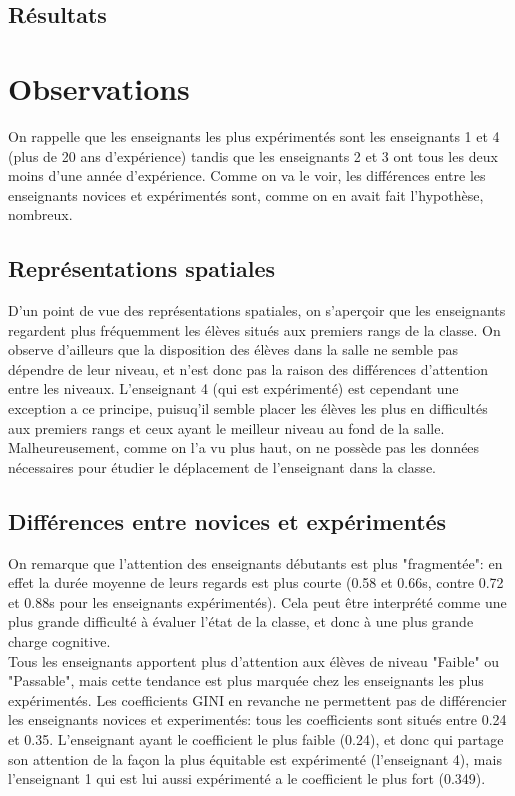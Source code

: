 \documentclass{article}
\begin{document}
\subsection{Résultats}

\section{Observations}
On rappelle que les enseignants les plus expérimentés sont les enseignants 1 et 4 (plus de 20 ans d'expérience) tandis que les enseignants 2 et 3 ont tous les deux moins d'une année d'expérience. Comme on va le voir, les différences entre les enseignants novices et expérimentés sont, comme on en avait fait l'hypothèse, nombreux.
\subsection{Représentations spatiales}
D'un point de vue des représentations spatiales, on s'aperçoir que les enseignants regardent plus fréquemment les élèves situés aux premiers rangs de la classe. On observe d'ailleurs que la disposition des élèves dans la salle ne semble pas dépendre de leur niveau, et n'est donc pas la raison des différences d'attention entre les niveaux. L'enseignant 4 (qui est expérimenté) est cependant une exception a ce principe, puisuq'il semble placer les élèves les plus en difficultés aux premiers rangs et ceux ayant le meilleur niveau au fond de la salle.\\
Malheureusement, comme on l'a vu plus haut, on ne possède pas les données nécessaires pour étudier le déplacement de l'enseignant dans la classe.

\subsection{Différences entre novices et expérimentés}
On remarque que l'attention des enseignants débutants est plus "fragmentée": en effet la durée moyenne de leurs regards est plus courte (0.58 et 0.66s, contre 0.72 et 0.88s pour les enseignants expérimentés). Cela peut être interprété comme une plus grande difficulté à évaluer l'état de la classe, et donc à une plus grande charge cognitive.\\
Tous les enseignants apportent plus d'attention aux élèves de niveau "Faible" ou "Passable", mais cette tendance est plus marquée chez les enseignants les plus expérimentés.
Les coefficients GINI en revanche ne permettent pas de différencier les enseignants novices et experimentés: tous les coefficients sont situés entre 0.24 et 0.35. L'enseignant ayant le coefficient le plus faible (0.24), et donc qui partage son attention de la façon la plus équitable est expérimenté (l'enseignant 4), mais l'enseignant 1 qui est lui aussi expérimenté a le coefficient le plus fort (0.349).\\
\end{document}

